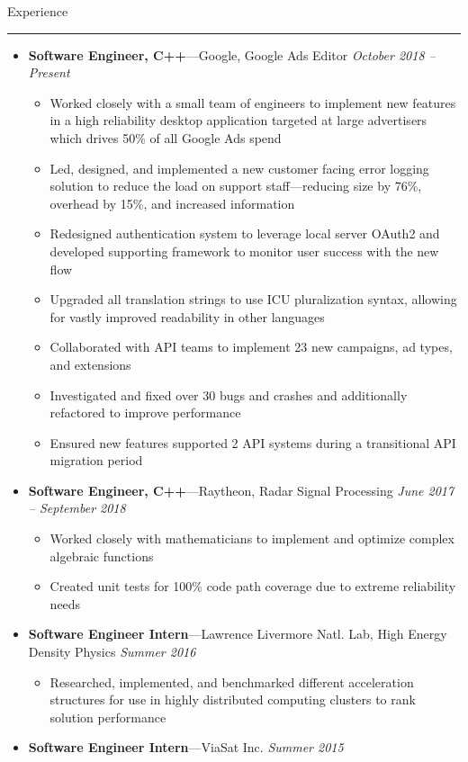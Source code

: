 \documentclass[10pt,oneside]{article}
\newcommand{\sectitle}[1]{
  \begin{flushleft}{\selectfont\Large#1}\end{flushleft}
}
\newenvironment{ressection}[1]{
  \vspace{0pt}
  \sectitle{#1}
  \vspace{-10pt}\rule{\textwidth}{0.5pt}
  \vspace{-10pt}
  \begin{itemize}[leftmargin=13pt]
  \vspace{-2pt}
}{
  \end{itemize}
}
\newcommand{\ressubitem}[1]{
  \vspace{-1pt}
  \item[--] \begin{flushleft} #1 \end{flushleft}
}
\newcommand{\resbigitemline}[3]{
  \vspace{-1pt}
  \item
  \textbf{#1}---#2
  \hfill
  \textit{#3}
}
\newenvironment{ressubsecline}[3]{
  \resbigitemline{#1}{#2}{#3}
  \vspace{-2pt}
  \begin{itemize}
}{
  \end{itemize}
  \vspace{-2pt}
}
\begin{document}
\begin{ressection}{Experience}
  \begin{ressubsecline}{Software Engineer, C++}{Google, Google Ads Editor}{October 2018 -- Present}
    \ressubitem{Worked closely with a small team of engineers to implement new features in a high reliability desktop application targeted at large advertisers which drives 50\% of all Google Ads spend}
    \ressubitem{Led, designed, and implemented a new customer facing error logging solution to reduce the load on support staff---reducing size by 76\%, overhead by 15\%, and increased information}
    \ressubitem{Redesigned authentication system to leverage local server OAuth2 and developed supporting framework to monitor user success with the new flow}
    \ressubitem{Upgraded all translation strings to use ICU pluralization syntax, allowing for vastly improved readability in other languages}
    \ressubitem{Collaborated with API teams to implement 23 new campaigns, ad types, and extensions}
    \ressubitem{Investigated and fixed over 30 bugs and crashes and additionally refactored to improve performance}
    \ressubitem{Ensured new features supported 2 API systems during a transitional API migration period}
  \end{ressubsecline}
  \begin{ressubsecline}{Software Engineer, C++}{Raytheon, Radar Signal Processing}{June 2017 -- September 2018}
    \ressubitem{Worked closely with mathematicians to implement and optimize complex algebraic functions}
    \ressubitem{Created unit tests for 100\% code path coverage due to extreme reliability needs}
  \end{ressubsecline}
  \begin{ressubsecline}{Software Engineer Intern}{Lawrence Livermore Natl. Lab, High Energy Density Physics}{Summer 2016}
    \ressubitem{Researched, implemented, and benchmarked different acceleration structures for use in highly distributed computing clusters to rank solution performance}
  \end{ressubsecline}
  \resbigitemline{Software Engineer Intern}{ViaSat Inc.}{Summer 2015}
\end{ressection}
\end{document}
